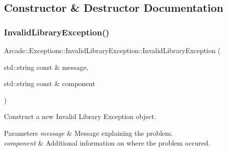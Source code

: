 \subsection{Constructor \& Destructor Documentation}
\mbox{\label{classArcade_1_1Exceptions_1_1InvalidLibraryException_ae3325fe59ba1cace4e7ef32db01ab790}} 
\subsubsection{\texorpdfstring{InvalidLibraryException()}{InvalidLibraryException()}}
{\footnotesize\ttfamily Arcade\+::\+Exceptions\+::\+Invalid\+Library\+Exception\+::\+Invalid\+Library\+Exception (\begin{DoxyParamCaption}\item[{std\+::string const \&}]{message,  }\item[{std\+::string const \&}]{component }\end{DoxyParamCaption})}



Construct a new Invalid Library Exception object. 


\begin{DoxyParams}{Parameters}
{\em message} & Message explaining the problem. \\
\hline
{\em component} & Additional information on where the problem occured. \\
\hline
\end{DoxyParams}
